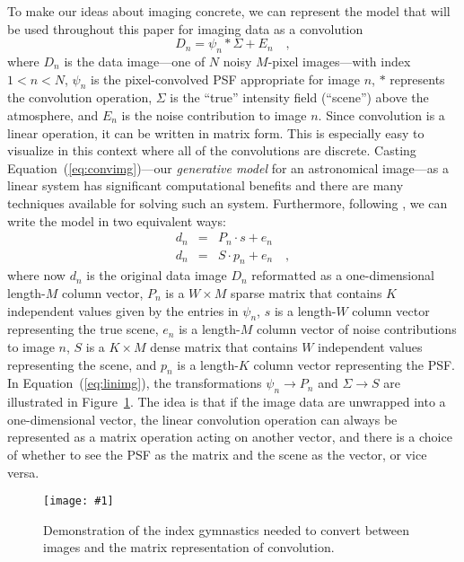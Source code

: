\documentclass[12pt,preprint]{aastex}
\newcommand{\Fig}[1]{Figure~\ref{fig:#1}}
\newcommand{\fig}[1]{\Fig{#1}}
\newcommand{\figlabel}[1]{\label{fig:#1}}
\newcommand{\Eq}[1]{Equation~(\ref{eq:#1})}
\newcommand{\eq}[1]{\Eq{#1}}
\newcommand{\eqlabel}[1]{\label{eq:#1}}
\newcommand{\data}{\ensuremath{D}}
\newcommand{\scene}{\ensuremath{\Sigma}}
\newcommand{\psf}{\ensuremath{\psi}}
\newcommand{\dvec}{\ensuremath{d}}
\newcommand{\evec}{\ensuremath{e}}
\newcommand{\svec}{\ensuremath{s}}
\newcommand{\smat}{\ensuremath{S}}
\newcommand{\pvec}{\ensuremath{p}}
\newcommand{\pmat}{\ensuremath{P}}
\newcommand{\dfmplot}[1]{%
\begin{center}%
    \texttt{[image: \#1]}%
\end{center}%
}
\begin{document}
To make our ideas about imaging concrete, we can represent the model
that will be used throughout this paper for imaging data as a
convolution
\begin{equation}\eqlabel{convimg}
    \data_n = \psf_n \ast \scene + E_n \quad,
\end{equation}
where $\data_n$ is the data image---one of $N$ noisy $M$-pixel
images---with index $1<n<N$, $\psf_n$ is the pixel-convolved PSF
appropriate for image $n$, $\ast$ represents the convolution
operation, $\scene$ is the ``true'' intensity field (``scene'') above
the atmosphere, and $E_n$ is the noise contribution to image $n$.
Since convolution is a linear operation, it can be written in matrix
form. This is especially easy to visualize in this context where all of
the convolutions are discrete. Casting \eq{convimg}---our
\emph{generative model} for an astronomical image---as a linear system
has significant computational benefits and there are many techniques
available for solving such an system. Furthermore, following
\citet{hirsch}, we can write the model in two equivalent ways:
\begin{eqnarray}\eqlabel{linimg}\displaystyle
\dvec_n &=& \pmat_n \cdot \svec + \evec_n
\\
\dvec_n &=& \smat \cdot \pvec_n + \evec_n
\quad ,
\end{eqnarray}
where now $\dvec_n$ is the original data image $\data_n$ reformatted as a
one-dimensional length-$M$ column vector, $\pmat_n$ is a $W\times M$
sparse matrix that contains $K$ independent values given by the entries
in $\psf_n$, $s$ is a length-$W$ column vector representing the true
scene, $\evec_n$ is a length-$M$ column vector of noise contributions to
image $n$, $\smat$ is a $K\times M$ dense matrix that contains $W$
independent values representing the scene, and $\pvec_n$ is a length-$K$
column vector representing the PSF\@. In \eq{linimg}, the transformations
$\psf_n \to \pmat_n$ and $\scene \to \smat$ are illustrated in \fig{index}.
The idea is that if the image data are unwrapped into a
one-dimensional vector, the linear convolution operation can always be
represented as a matrix operation acting on another vector, and there
is a choice of whether to see the PSF as the matrix and the scene as
the vector, or vice versa.

\begin{figure}[!htbp]
    \dfmplot{index_gymnastics.pdf}
    \caption{Demonstration of the index gymnastics needed to convert between
        images and the matrix representation of convolution.\figlabel{index}}
\end{figure}
\end{document}
